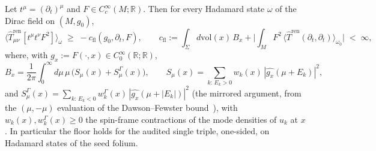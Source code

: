 \begin{theorem}
\label{thm:dirac-seed-floor}
Let $t^\mu=(\partial_t)^\mu$ and $F\in C_c^\infty(M;\mathbb R)$. Then
for every Hadamard state $\omega$ of the Dirac field on $(M,g_0)$,
\[
\big\langle\widehat T^{\mathrm{ren}}_{\mu\nu}[t^\mu t^\nu F^{2}]
\big\rangle_\omega \;\ge\; -c_{\mathrm{fl}}(g_0,\partial_t,F),\qquad
c_{\mathrm{fl}}:=\int_\Sigma\!d\mathrm{vol}(x)\,B_x
+\Big|\int_M F^{2}\,\big\langle\widehat T^{\mathrm{ren}}
(\partial_t,\partial_t)\big\rangle_{\omega_0}\Big|\;<\;\infty,
\]
where, with $g_x:=F(\cdot,x)\in C_0^\infty(\mathbb R;\mathbb R)$,
\[
B_x=\frac1{2\pi}\int_0^\infty\!d\mu\,\mu\,
\big(S_\mu(x)+S^\Gamma_\mu(x)\big),\qquad
S_\mu(x)=\sum_{k:\,E_k>0} w_k(x)\,|\widehat{g_x}(\mu+E_k)|^{2},
\]
and $S^\Gamma_\mu(x)=\sum_{k:\,E_k<0}w^\Gamma_k(x)\,
|\widehat{g_x}(\mu+|E_k|)|^{2}$ (the mirrored argument, from the
$(\mu,-\mu)$ evaluation of the Dawson--Fewster
bound~\cite{DawsonFewster2006}), with $w_k(x),w^\Gamma_k(x)\ge0$ the
spin-frame contractions of the mode densities of $u_k$ at $x$. In
particular the floor holds for the audited single triple, one-sided,
on Hadamard states of the seed folium.
\end{theorem}

